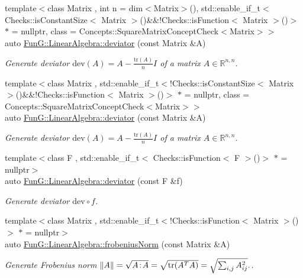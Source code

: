 \begin{DoxyCompactItemize}
{\footnotesize template$<$class Matrix , int n = dim$<$\-Matrix$>$(), std\-::enable\-\_\-if\-\_\-t$<$ Checks\-::is\-Constant\-Size$<$ Matrix $>$()\&\&!\-Checks\-::is\-Function$<$ Matrix $>$()$>$ $\ast$  = nullptr, class  = \-Concepts\-::\-Square\-Matrix\-Concept\-Check$<$\-Matrix$>$$>$ }\\auto \hyperlink{group__LinearAlgebraGroup_ga7c0b1db93cfc5779a3b1e7eb1646c213}{\-Fun\-G\-::\-Linear\-Algebra\-::deviator} (const \-Matrix \&\-A)
\begin{DoxyCompactList}\small\item\em \-Generate deviator $ \mathrm{dev}(A) = A - \frac{\mathrm{tr}(A)}{n}I $ of a matrix $ A\in\mathbb{R}^{n,n} $. \end{DoxyCompactList}\item 
{\footnotesize template$<$class Matrix , std\-::enable\-\_\-if\-\_\-t$<$!\-Checks\-::is\-Constant\-Size$<$ Matrix $>$()\&\&!\-Checks\-::is\-Function$<$ Matrix $>$()$>$ $\ast$  = nullptr, class  = \-Concepts\-::\-Square\-Matrix\-Concept\-Check$<$\-Matrix$>$$>$ }\\auto \hyperlink{group__LinearAlgebraGroup_gabc90de0d1754cd2e2d190ea8ba62245f}{\-Fun\-G\-::\-Linear\-Algebra\-::deviator} (const \-Matrix \&\-A)
\begin{DoxyCompactList}\small\item\em \-Generate deviator $ \mathrm{dev}(A) = A - \frac{\mathrm{tr}(A)}{n}I $ of a matrix $ A\in\mathbb{R}^{n,n} $. \end{DoxyCompactList}\item 
{\footnotesize template$<$class F , std\-::enable\-\_\-if\-\_\-t$<$ Checks\-::is\-Function$<$ F $>$()$>$ $\ast$  = nullptr$>$ }\\auto \hyperlink{group__LinearAlgebraGroup_gad363f3add577abc046fc525ce83e22d3}{\-Fun\-G\-::\-Linear\-Algebra\-::deviator} (const \-F \&f)
\begin{DoxyCompactList}\small\item\em \-Generate deviator $ \mathrm{dev}\circ f$. \end{DoxyCompactList}\item 
{\footnotesize template$<$class Matrix , std\-::enable\-\_\-if\-\_\-t$<$!\-Checks\-::is\-Function$<$ Matrix $>$()$>$ $\ast$  = nullptr$>$ }\\auto \hyperlink{group__LinearAlgebraGroup_gaa893e7d667dde98d2b119ca004745186}{\-Fun\-G\-::\-Linear\-Algebra\-::frobenius\-Norm} (const \-Matrix \&\-A)
\begin{DoxyCompactList}\small\item\em \-Generate \-Frobenius norm $ \|A\| = \sqrt{A\negthinspace : \negthinspace A }= \sqrt{\mathrm{tr}(A^TA)} = \sqrt{\sum_{i,j} A_{ij}^2}. $. \end{DoxyCompactList}\item 

\end{DoxyCompactItemize}

